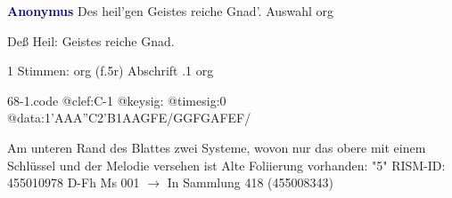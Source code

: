 \documentclass[twocolumn]{book}
\begin{document}
\newline \par \vspace{7pt} \textcolor{darkblue}{\textbf{Anonymus  }}
\newline Des heil'gen Geistes reiche Gnad'. Auswahl
\newline org
\newline \begin{itshape} Deß Heil: Geistes reiche Gnad.\end{itshape} 
\newline \textcolor{darkblue}{}  1 Stimmen: org  (f.5r)
\newline Abschrift
.1  org  
\begin{filecontents*}{68-1.code}
@clef:C-1
@keysig:
@timesig:0
@data:1'AAA''C2'B1AAGFE/GGFGAFEF/
\end{filecontents*}
\newline
%
\newline Am unteren Rand des Blattes zwei Systeme, wovon nur das obere mit einem Schlüssel und der Melodie versehen ist
\newline Alte Foliierung vorhanden: "5"
\newline RISM-ID: 455010978
\newline D-Fh  Ms 001
\newline $\rightarrow$ In Sammlung 418 (455008343)
      
\end{document}
